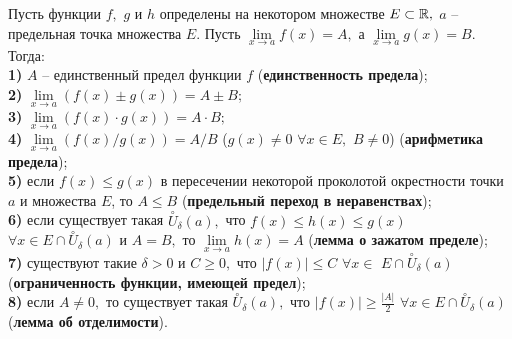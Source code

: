 \begin{theorem} Пусть функции $f,$ $g$ и $h$
    определены на некотором множестве $E\subset\mathbb{R},$
    $a$ -- предельная точка множества $E.$
    Пусть $\lim\limits_{x\rightarrow a}f(x)=A,$ а
    $\lim\limits_{x\rightarrow a}g(x)=B$. Тогда:\\
    \textbf{1)} $A$ -- единственный предел функции $f$
    (\textbf{единственность предела});\\
    \textbf{2)} $\lim\limits_{x\rightarrow a}(f(x)\pm g(x))=A\pm B;$\\
    \textbf{3)} $\lim\limits_{x\rightarrow a}(f(x)\cdot g(x))=A\cdot B;$\\
    \textbf{4)} $\lim\limits_{x\rightarrow a}(f(x)/g(x))=A/B$
    ($g(x)\neq0$ $\forall x \in E,$ $B\neq0$)
    (\textbf{арифметика предела});\\
    \textbf{5)} если $f(x)\leq g(x)$ в пересечении некоторой
    проколотой окрестности точки $a$ и множества $E$, то $A\leq B$
    (\textbf{предельный переход в неравенствах});\\
    \textbf{6)} если существует такая
    $\stackrel{\circ}{U}_{\delta}(a),$ что
    $f(x)\leq h(x)\leq g(x)$ $\forall
        x\in E\cap\stackrel{\circ}{U}_{\delta}(a)$
    и $A=B,$ то
    $\lim\limits_{x\rightarrow a}h(x)=A$
    (\textbf{лемма о зажатом пределе});\\
    \textbf{7)} существуют такие $\delta>0$
    и $C\geq0,$ что
    $|f(x)|\leq C$ $\forall x\in$
    $E\cap\stackrel{\circ}{U}_{\delta}(a)$
    (\textbf{ограниченность функции, имеющей предел});\\
    \textbf{8)} если $A\neq0,$ то существует такая
    $\stackrel{\circ}{U}_{\delta}(a),$ что
    $|f(x)|\geq\frac{|A|}{2}$ $\forall x\in
        E\cap\stackrel{\circ}{U}_{\delta}(a)$
    (\textbf{лемма об отделимости}).
\end{theorem}
